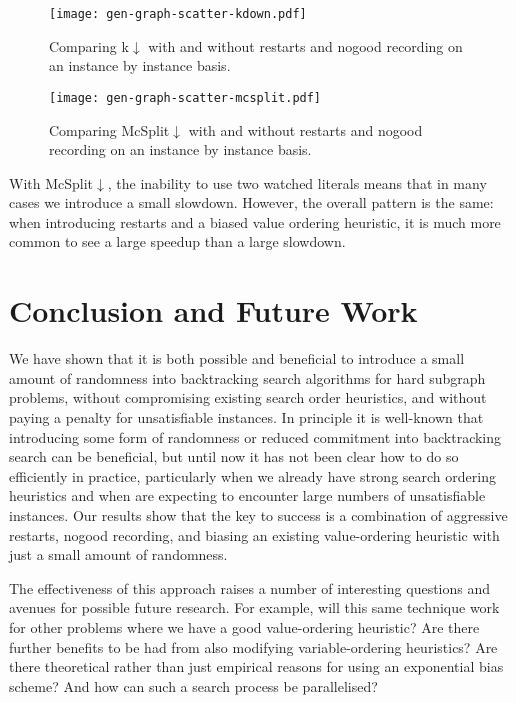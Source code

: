 \documentclass[letterpaper]{article} %
\begin{document}
\begin{figure}[p]
    \centering
    \texttt{[image: gen-graph-scatter-kdown.pdf]}
    \caption{Comparing k${\downarrow}$ with and without restarts and nogood recording on an instance
    by instance basis.}\label{figure:kdown}
\end{figure}

\begin{figure}[p]
    \centering
    \texttt{[image: gen-graph-scatter-mcsplit.pdf]}
    \caption{Comparing McSplit${\downarrow}$ with and without restarts and nogood recording on an instance
    by instance basis.}\label{figure:mcsplit}
\end{figure}


With McSplit${\downarrow}$, the inability to use two watched literals means that in many cases we
introduce a small slowdown. However, the overall pattern is the same: when introducing restarts and
a biased value ordering heuristic, it is much more common to see a large speedup than a large
slowdown.

\section{Conclusion and Future Work}

We have shown that it is both possible and beneficial to introduce a small amount of randomness into
backtracking search algorithms for hard subgraph problems, without compromising existing search
order heuristics, and without paying a penalty for unsatisfiable instances. In principle it is
well-known that introducing some form of randomness \cite{DBLP:conf/aaai/GomesSK98} or reduced
commitment \cite{DBLP:conf/ijcai/HarveyG95} into backtracking search can be beneficial, but until
now it has not been clear how to do so efficiently in practice, particularly when we already have
strong search ordering heuristics and when are expecting to encounter large numbers of unsatisfiable
instances. Our results show that the key to success is a combination of aggressive restarts, nogood
recording, and biasing an existing value-ordering heuristic with just a small amount of randomness.

The effectiveness of this approach raises a number of interesting questions and avenues for possible
future research. For example, will this same technique work for other problems where we have a good
value-ordering heuristic? Are there further benefits to be had from also modifying variable-ordering
heuristics? Are there theoretical rather than just empirical reasons for using an exponential bias
scheme? And how can such a search process be parallelised?
\end{document}
